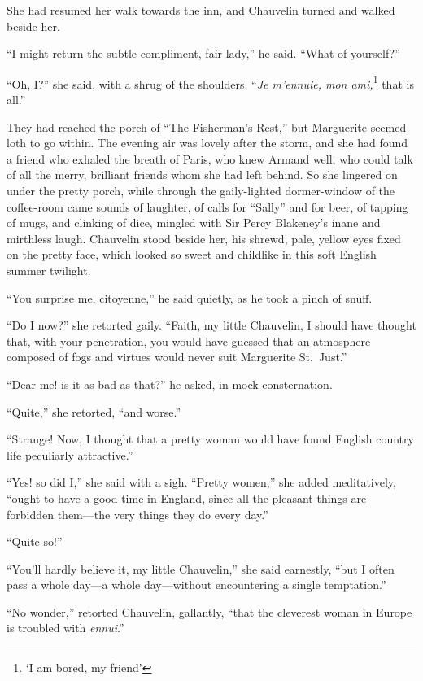 \documentclass[paper=a5,BCOR=7mm,twoside,DIV=calc,12pt,usegeometry,chapterprefix,endperiod,headings=big]{scrbook}
\begin{document}
She had resumed her walk towards the inn, and Chauvelin turned and walked beside her.

\enquote{I might return the subtle compliment, fair lady,} he said. \enquote{What of yourself?}

\enquote{Oh, I?} she said, with a shrug of the shoulders. \enquote{\textit{Je m'ennuie, mon ami,}\footnote{\enquote{I am bored, my friend}} that is all.}

They had reached the porch of \enquote{The Fisherman's Rest,} but Marguerite seemed loth to go within. The evening air was lovely after the storm, and she had found a friend who exhaled the breath of Paris, who knew Armand well, who could talk of all the merry, brilliant friends whom she had left behind. So she lingered on under the pretty porch, while through the gaily-lighted dormer-window of the coffee-room came sounds of laughter, of calls for \enquote{Sally} and for beer, of tapping of mugs, and clinking of dice, mingled with Sir Percy Blakeney's inane and mirthless laugh. Chauvelin stood beside her, his shrewd, pale, yellow eyes fixed on the pretty face, which looked so sweet and childlike in this soft English summer twilight.

\enquote{You surprise me, citoyenne,} he said quietly, as he took a pinch of snuff.

\enquote{Do I now?} she retorted gaily. \enquote{Faith, my little Chauvelin, I should have thought that, with your penetration, you would have guessed that an atmosphere composed of fogs and virtues would never suit Marguerite St.~Just.}

\enquote{Dear me! is it as bad as that?} he asked, in mock consternation.

\enquote{Quite,} she retorted, \enquote{and worse.}

\enquote{Strange! Now, I thought that a pretty woman would have found English country life peculiarly attractive.}

\enquote{Yes! so did I,} she said with a sigh. \enquote{Pretty women,} she added meditatively, \enquote{ought to have a good time in England, since all the pleasant things are forbidden them---the very things they do every day.}

\enquote{Quite so!}

\enquote{You'll hardly believe it, my little Chauvelin,} she said earnestly, \enquote{but I often pass a whole day---a whole day---without encountering a single temptation.}

\enquote{No wonder,} retorted Chauvelin, gallantly, \enquote{that the cleverest woman in Europe is troubled with \textit{ennui}.}
\end{document}
